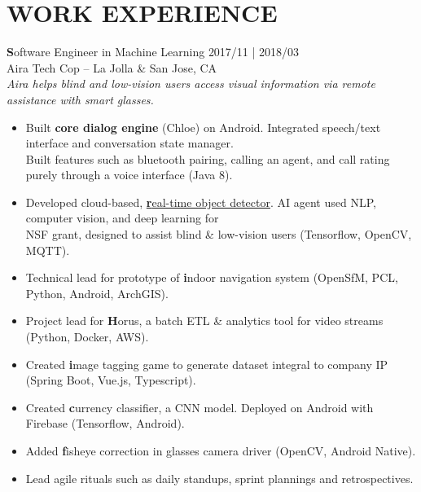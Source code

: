 \documentclass[line,mm]{res}
\begin{document}
    \section{WORK EXPERIENCE}\label{sec:work-experience}
    {\textbf Software Engineer in Machine Learning }  2017/11 | 2018/03 \\
    Aira Tech Cop -- La Jolla \& San Jose, CA \\
    \textit{ Aira helps blind and low-vision users access visual information via remote assistance with smart glasses. }
    \begin{itemize}
        \itemsep -2pt
        \item Built {\textbf{core dialog engine}  (Chloe)} on Android. Integrated speech/text interface and conversation state manager. \\
              Built features such as bluetooth pairing, calling an agent, and call rating purely through a voice interface (Java 8).
        \item Developed cloud-based, \href{https://github.com/aira/object_detector}{{\textbf real-time object detector}}. AI agent used NLP, computer vision, and deep learning for \\
              NSF grant, designed to assist blind \& low-vision users (Tensorflow, OpenCV, MQTT).
        \item Technical lead for prototype of {\textbf indoor navigation system} (OpenSfM, PCL, Python, Android, ArchGIS).
        \item Project lead for {\textbf Horus}, a batch ETL \& analytics tool for video streams (Python, Docker, AWS).
        \item Created {\textbf image tagging game} to generate dataset integral to company IP (Spring Boot, Vue.js, Typescript).
        \item Created {\textbf currency classifier}, a CNN model. Deployed on Android with Firebase (Tensorflow, Android).
        \item Added {\textbf fisheye correction} in glasses camera driver (OpenCV, Android Native).
        \item Lead agile rituals such as daily standups, sprint plannings and retrospectives.
    \end{itemize}
\end{document}
